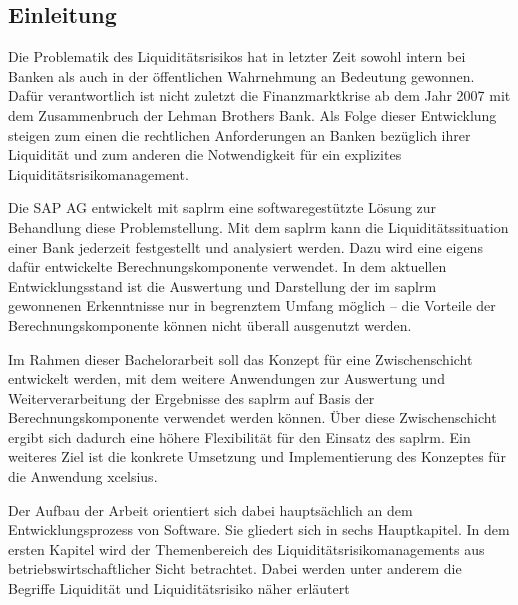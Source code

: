

\begin{onehalfspacing}

\chapter{Einleitung}
\glsresetall
Die Problematik des Liquiditätsrisikos hat in letzter Zeit sowohl intern bei Banken als auch in der öffentlichen Wahrnehmung an Bedeutung gewonnen. Dafür verantwortlich ist nicht zuletzt die Finanzmarktkrise ab dem Jahr 2007 mit dem Zusammenbruch der Lehman Brothers Bank. Als Folge dieser Entwicklung steigen zum einen die rechtlichen Anforderungen an Banken bezüglich ihrer Liquidität und zum anderen die Notwendigkeit für ein explizites Liquiditätsrisikomanagement. 

Die SAP AG entwickelt mit \gls{saplrm} eine softwaregestützte Lösung zur Behandlung diese Problemstellung. Mit dem \gls{saplrm} kann die Liquiditätssituation einer Bank jederzeit festgestellt und analysiert werden. Dazu wird eine eigens dafür entwickelte Berechnungskomponente verwendet. In dem aktuellen Entwicklungsstand ist die Auswertung und Darstellung der im \gls{saplrm} gewonnenen Erkenntnisse nur in begrenztem Umfang möglich -- die Vorteile der Berechnungskomponente können nicht überall ausgenutzt werden.

Im Rahmen dieser Bachelorarbeit soll das Konzept für eine Zwischenschicht entwickelt werden, mit dem weitere Anwendungen zur Auswertung und Weiterverarbeitung der Ergebnisse des \gls{saplrm} auf Basis der Berechnungskomponente verwendet werden können. Über diese Zwischenschicht ergibt sich dadurch eine höhere Flexibilität für den Einsatz des \gls{saplrm}. Ein weiteres Ziel ist die konkrete Umsetzung und Implementierung des Konzeptes für die Anwendung \gls{xcelsius}.

Der Aufbau der Arbeit orientiert sich dabei hauptsächlich an dem Entwicklungsprozess von Software. Sie gliedert sich in sechs Hauptkapitel. In dem ersten Kapitel wird der Themenbereich des Liquiditätsrisikomanagements aus betriebswirtschaftlicher Sicht betrachtet. Dabei werden unter anderem die Begriffe Liquidität und Liquiditätsrisiko näher erläutert


\end{onehalfspacing}
